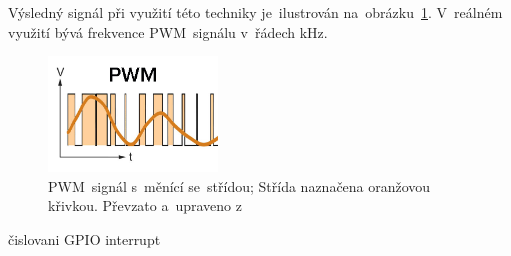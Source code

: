Výsledný signál při využití této techniky je~ilustrován na~obrázku~\ref{fig:pwm}. V~reálném využití bývá frekvence PWM~signálu v~řádech kHz.

\begin{figure}[htb]
  \centering
  \includegraphics[width=0.4\textwidth]{img/pwm.jpg}
  \caption{\label{fig:pwm} PWM~signál s~měnící se~střídou; Střída naznačena oranžovou křivkou. Převzato a~upraveno z~\cite{pwm-image}}
\end{figure}

čislovani GPIO
interrupt

